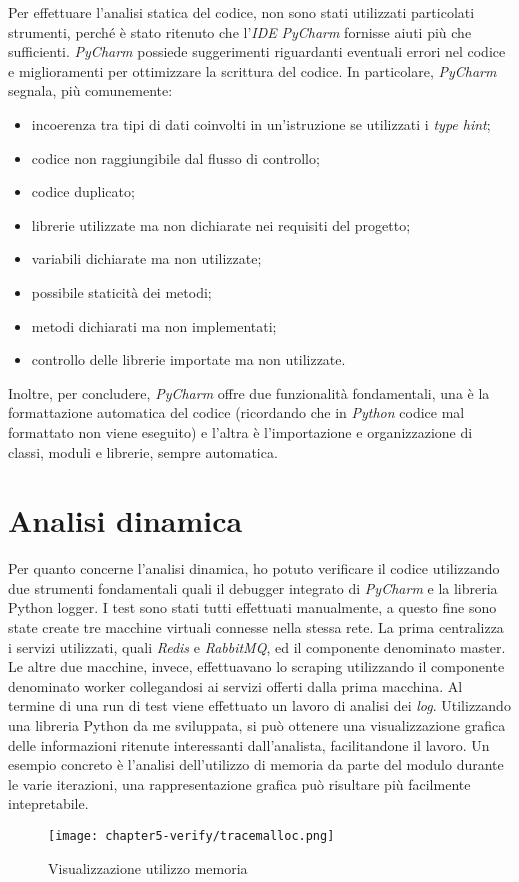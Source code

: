 Per effettuare l’analisi statica del codice, non sono stati utilizzati particolati strumenti, perché è stato ritenuto che l’\emph{IDE} \emph{PyCharm} fornisse aiuti più che sufficienti. \emph{PyCharm} possiede suggerimenti riguardanti eventuali errori nel codice e miglioramenti per ottimizzare la scrittura del codice.
In particolare, \emph{PyCharm} segnala, più comunemente:
\begin{itemize}
	\item incoerenza tra tipi di dati coinvolti in un’istruzione se utilizzati i \emph{type hint};
	\item codice non raggiungibile dal flusso di controllo;
	\item codice duplicato;
	\item librerie utilizzate ma non dichiarate nei requisiti del progetto;
	\item variabili dichiarate ma non utilizzate;
	\item possibile staticità dei metodi;
	\item metodi dichiarati ma non implementati;
	\item controllo delle librerie importate ma non utilizzate.
\end{itemize}
\noindent
Inoltre, per concludere, \emph{PyCharm} offre due funzionalità fondamentali, una è la formattazione automatica del codice (ricordando che in \emph{Python} codice mal formattato non viene eseguito) e l’altra è l’importazione e organizzazione di classi, moduli e librerie, sempre automatica.

\section{Analisi dinamica}

Per quanto concerne l’analisi dinamica, ho potuto verificare il codice utilizzando due strumenti fondamentali quali il debugger integrato di \emph{PyCharm} e la libreria Python logger. I test sono stati tutti effettuati manualmente, a questo fine sono state create tre macchine virtuali connesse nella stessa rete. La prima centralizza i servizi utilizzati, quali \emph{Redis} e \emph{RabbitMQ}, ed il componente denominato master. Le altre due macchine, invece, effettuavano lo scraping utilizzando il componente denominato worker collegandosi ai servizi offerti dalla prima macchina. \newline{}
Al termine di una run di test viene effettuato un lavoro di analisi dei \emph{log}. Utilizzando una libreria Python da me sviluppata, si può ottenere una visualizzazione grafica delle informazioni ritenute interessanti dall'analista, facilitandone il lavoro. Un esempio concreto è l'analisi dell'utilizzo di memoria da parte del modulo durante le varie iterazioni, una rappresentazione grafica può risultare più facilmente intepretabile.

\begin{figure}[!h] 
    \centering 
    \texttt{[image: chapter5-verify/tracemalloc.png]} 
    \caption{Visualizzazione utilizzo memoria}
    \label{fig:visualizzazione-utilizzo-memoria} 
\end{figure}




